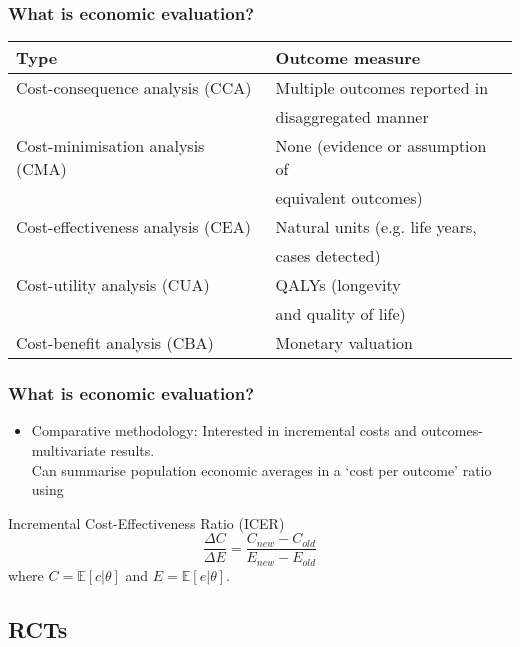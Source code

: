 \begin{frame}
\frametitle{What is economic evaluation?}
\begin{table}
	\centering
		\begin{tabular}{l l}
		\hline
\textbf{Type} & \textbf{Outcome measure} \\
\hline \hline
Cost-\alert{consequence} analysis
(CCA) & Multiple outcomes reported in\\
&disaggregated manner\\
Cost-\alert{minimisation} analysis
(CMA) & None (evidence or assumption of\\
&equivalent outcomes)\\
Cost-\alert{effectiveness} analysis
(CEA) & Natural units (e.g. life years,\\
 &cases detected)\\
Cost-\alert{utility} analysis (CUA) & QALYs (longevity \\
&and quality of life)\\
Cost-\alert{benefit} analysis
(CBA) & Monetary valuation\\
\hline
		\end{tabular}
\end{table}
\end{frame}


\begin{frame}
\frametitle{What is economic evaluation?}
	\begin{itemize}
			\item \alert{Comparative methodology}: Interested in incremental costs and outcomes- multivariate results.\\
			Can summarise population economic averages in a `cost per outcome' ratio using
	\end{itemize}
	
	\begin{definition}
Incremental Cost-Effectiveness Ratio (ICER)
$$
\frac{\Delta C}{\Delta E} = \frac{C_{new} - C_{old}}{E_{new} - E_{old}}
$$
where $C=\mathbb{E}[c|\theta]$ and $E=\mathbb{E}[e|\theta]$.
\end{definition}
	
\end{frame}


\subsection{RCTs}

